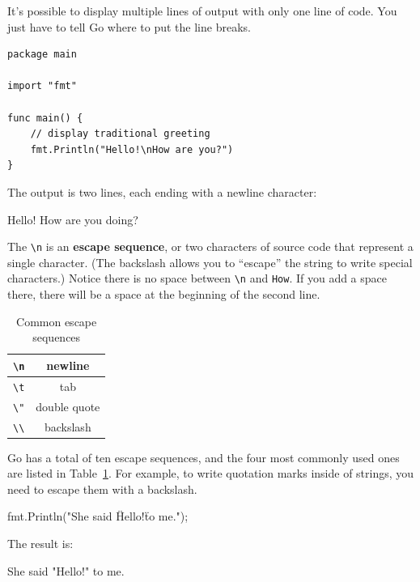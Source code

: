 It's possible to display multiple lines of output with only one line of code.
You just have to tell Go where to put the line breaks.

\begin{lstlisting}
package main

import "fmt"

func main() {
	// display traditional greeting
	fmt.Println("Hello!\nHow are you?")
}
\end{lstlisting}

The output is two lines, each ending with a newline character:

\begin{stdout}
Hello!
How are you doing?
\end{stdout}


The \verb"\n" is an {\bf escape sequence}, or two characters of source code that represent a single character.
(The backslash allows you to ``escape'' the string to write special characters.)
Notice there is no space between \verb"\n" and \verb"How".
If you add a space there, there will be a space at the beginning of the second line.

\begin{table}[!ht]
\begin{center}
\begin{tabular}{|c|c|}
\hline
\verb"\n" & newline \\
\hline
\verb"\t" & tab \\
\hline
\verb'\"' & double quote \\
\hline
\verb"\\" & backslash \\
\hline
\end{tabular}
\caption{Common escape sequences}
\label{tab:escape}
\end{center}
\end{table}

Go has a total of ten escape sequences, and the four most commonly used ones are listed in Table~\ref{tab:escape}.
For example, to write quotation marks inside of strings, you need to escape them with a backslash.

\begin{code}
fmt.Println("She said \"Hello!\" to me.");
\end{code}

The result is:

\begin{stdout}
She said "Hello!" to me.
\end{stdout}

